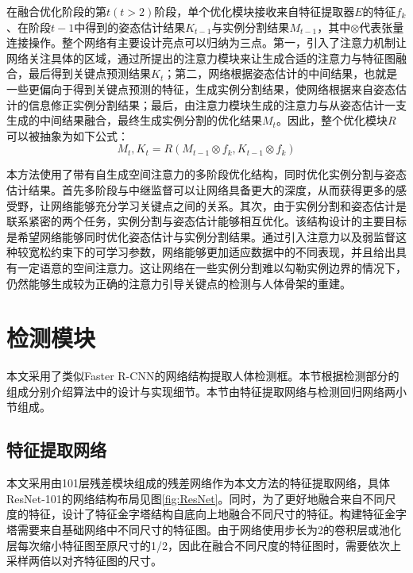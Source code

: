 在融合优化阶段的第$t(t>2)$阶段，单个优化模块接收来自特征提取器$E$的特征$f_k$、在阶段$t-1$中得到的姿态估计结果$K_{t-1}$与实例分割结果$M_{t-1}$，其中$\otimes$代表张量连接操作。整个网络有主要设计亮点可以归纳为三点。第一，引入了注意力机制让网络关注具体的区域，通过所提出的注意力模块来让生成合适的注意力与特征图融合，最后得到关键点预测结果$K_t$；第二，网络根据姿态估计的中间结果，也就是一些更偏向于得到关键点预测的特征，生成实例分割结果，使网络根据来自姿态估计的信息修正实例分割结果；最后，由注意力模块生成的注意力与从姿态估计一支生成的中间结果融合，最终生成实例分割的优化结果$M_t$。因此，整个优化模块$R$可以被抽象为如下公式：
\begin{equation}
\label{def:refinenet}
M_t, K_t = R(M_{t-1}\otimes f_k, K_{t-1}\otimes f_k)
\end{equation}

本方法使用了带有自生成空间注意力的多阶段优化结构，同时优化实例分割与姿态估计结果。首先多阶段与中继监督可以让网络具备更大的深度，从而获得更多的感受野，让网络能够充分学习关键点之间的关系\cite{wei2016convolutional}。其次，由于实例分割和姿态估计是联系紧密的两个任务，实例分割与姿态估计能够相互优化。该结构设计的主要目标是希望网络能够同时优化姿态估计与实例分割结果。通过引入注意力以及弱监督这种较宽松约束下的可学习参数，网络能够更加适应数据中的不同表现，并且给出具有一定语意的空间注意力\cite{wang2017residual}。这让网络在一些实例分割难以勾勒实例边界的情况下，仍然能够生成较为正确的注意力引导关键点的检测与人体骨架的重建。

\section{检测模块}
\label{sec:detectionstage}
本文采用了类似Faster R-CNN\cite{Ren2015Faster}的网络结构提取人体检测框。本节根据检测部分的组成分别介绍算法中的设计与实现细节。本节由特征提取网络与检测回归网络两小节组成。

\subsection{特征提取网络}
\label{subsec:featextract}
本文采用由101层残差模块组成的残差网络作为本文方法的特征提取网络，具体ResNet-101的网络结构布局见图\ref{fig:ResNet}。同时，为了更好地融合来自不同尺度的特征，设计了特征金字塔\cite{Lin2016Feature}结构自底向上地融合不同尺寸的特征。构建特征金字塔需要来自基础网络中不同尺寸的特征图。由于网络使用步长为2的卷积层或池化层每次缩小特征图至原尺寸的1/2，因此在融合不同尺度的特征图时，需要依次上采样两倍以对齐特征图的尺寸。

